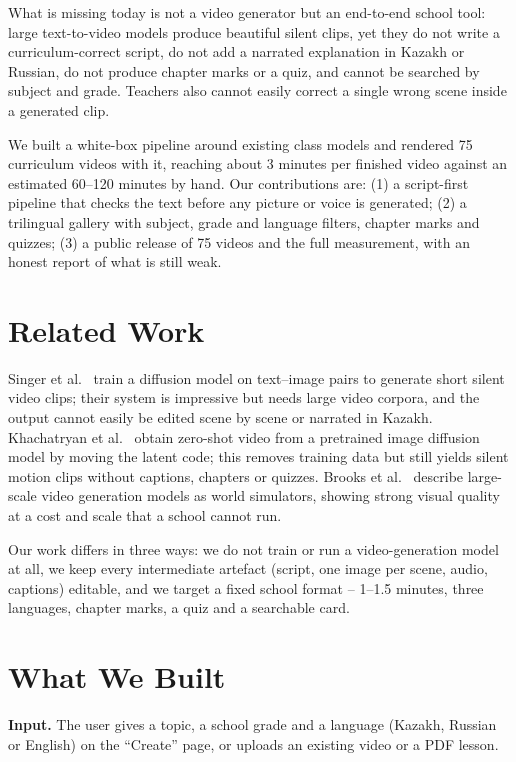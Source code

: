 \documentclass[10pt]{article}
\begin{document}
What is missing today is not a video generator but an end-to-end school tool: large text-to-video models produce beautiful silent clips, yet they do not write a curriculum-correct script, do not add a narrated explanation in Kazakh or Russian, do not produce chapter marks or a quiz, and cannot be searched by subject and grade. Teachers also cannot easily correct a single wrong scene inside a generated clip.

We built a white-box pipeline around existing class models and rendered 75 curriculum videos with it, reaching about 3 minutes per finished video against an estimated 60--120 minutes by hand. Our contributions are: (1) a script-first pipeline that checks the text before any picture or voice is generated; (2) a trilingual gallery with subject, grade and language filters, chapter marks and quizzes; (3) a public release of 75 videos and the full measurement, with an honest report of what is still weak.

\section{Related Work}

Singer et al.~\cite{singer2022} train a diffusion model on text--image pairs to generate short silent video clips; their system is impressive but needs large video corpora, and the output cannot easily be edited scene by scene or narrated in Kazakh. Khachatryan et al.~\cite{khachatryan2023} obtain zero-shot video from a pretrained image diffusion model by moving the latent code; this removes training data but still yields silent motion clips without captions, chapters or quizzes. Brooks et al.~\cite{brooks2024} describe large-scale video generation models as world simulators, showing strong visual quality at a cost and scale that a school cannot run.

Our work differs in three ways: we do not train or run a video-generation model at all, we keep every intermediate artefact (script, one image per scene, audio, captions) editable, and we target a fixed school format -- 1--1.5 minutes, three languages, chapter marks, a quiz and a searchable card.

\section{What We Built}

\textbf{Input.} The user gives a topic, a school grade and a language (Kazakh, Russian or English) on the ``Create'' page, or uploads an existing video or a PDF lesson.
\end{document}
